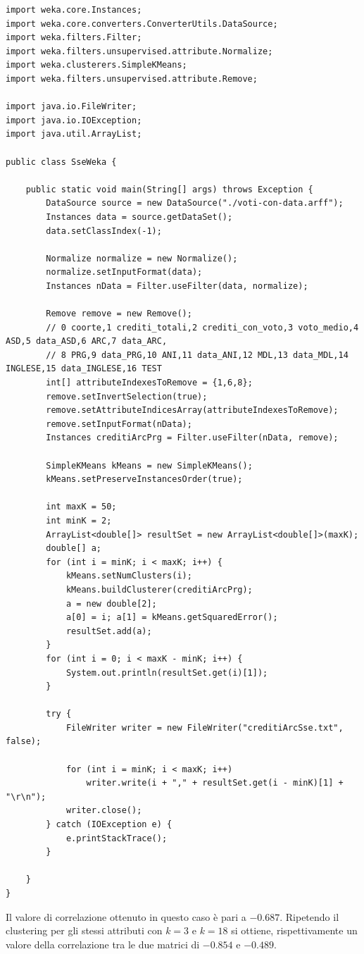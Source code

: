 \documentclass[12pt]{article}
\begin{document}
\begin{lstlisting}[caption={Codice Java per il calcolo di SSE al variare di K}, label={javasse}, captionpos=b, style = java]
import weka.core.Instances;
import weka.core.converters.ConverterUtils.DataSource;
import weka.filters.Filter;
import weka.filters.unsupervised.attribute.Normalize;
import weka.clusterers.SimpleKMeans;
import weka.filters.unsupervised.attribute.Remove;

import java.io.FileWriter;
import java.io.IOException;
import java.util.ArrayList;

public class SseWeka {

	public static void main(String[] args) throws Exception {
		DataSource source = new DataSource("./voti-con-data.arff");
		Instances data = source.getDataSet();
		data.setClassIndex(-1);

		Normalize normalize = new Normalize();
		normalize.setInputFormat(data);
		Instances nData = Filter.useFilter(data, normalize);

		Remove remove = new Remove();
		// 0 coorte,1 crediti_totali,2 crediti_con_voto,3 voto_medio,4 ASD,5 data_ASD,6 ARC,7 data_ARC,
		// 8 PRG,9 data_PRG,10 ANI,11 data_ANI,12 MDL,13 data_MDL,14 INGLESE,15 data_INGLESE,16 TEST
		int[] attributeIndexesToRemove = {1,6,8};
		remove.setInvertSelection(true);
		remove.setAttributeIndicesArray(attributeIndexesToRemove);
		remove.setInputFormat(nData);
		Instances creditiArcPrg = Filter.useFilter(nData, remove);

		SimpleKMeans kMeans = new SimpleKMeans();
		kMeans.setPreserveInstancesOrder(true);

		int maxK = 50;
		int minK = 2;
		ArrayList<double[]> resultSet = new ArrayList<double[]>(maxK);
		double[] a;
		for (int i = minK; i < maxK; i++) {
			kMeans.setNumClusters(i);
			kMeans.buildClusterer(creditiArcPrg);
			a = new double[2];
			a[0] = i; a[1] = kMeans.getSquaredError();
			resultSet.add(a);
		}
		for (int i = 0; i < maxK - minK; i++) {
			System.out.println(resultSet.get(i)[1]);
		}

		try {
			FileWriter writer = new FileWriter("creditiArcSse.txt", false);

			for (int i = minK; i < maxK; i++)
				writer.write(i + "," + resultSet.get(i - minK)[1] + "\r\n");
			writer.close();
		} catch (IOException e) {
			e.printStackTrace();
		}

	}
}		
\end{lstlisting}
Il valore di correlazione ottenuto in questo caso è pari a $-0.687$.
Ripetendo il clustering per gli stessi attributi con $k=3$ e $k=18$ si ottiene, 
rispetti\-vamente un valore della correlazione tra le due matrici di $-0.854$ e $-0.489$. 
\end{document}
